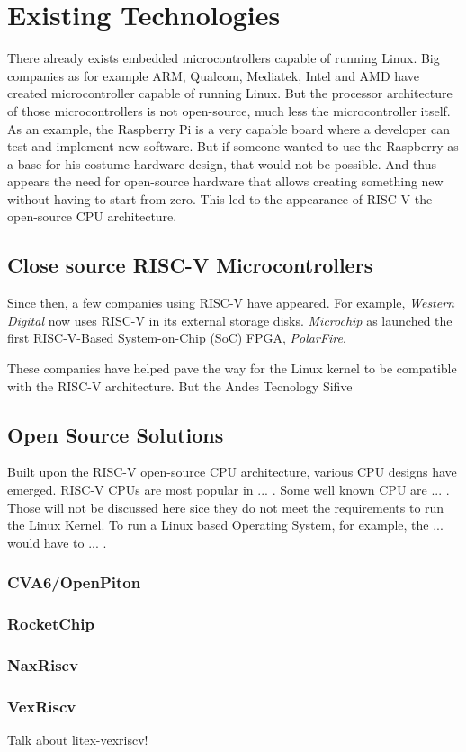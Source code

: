 \chapter{Existing Technologies}
There already exists embedded microcontrollers capable of running Linux. Big companies as for example ARM, Qualcom, Mediatek, Intel and AMD have created microcontroller capable of running Linux. But the processor architecture of those microcontrollers is not open-source, much less the microcontroller itself. As an example, the Raspberry Pi is a very capable board where a developer can test and implement new software. But if someone wanted to use the Raspberry as a base for his costume hardware design, that would not be possible. And thus appears the need for open-source hardware that allows creating something new without having to start from zero. This led to the appearance of RISC-V the open-source CPU architecture.

\section{Close source RISC-V Microcontrollers}
Since then, a few companies using RISC-V have appeared. For example, \textit{Western Digital} now uses RISC-V in its external storage disks. \textit{Microchip} as launched the first RISC-V-Based System-on-Chip (SoC) FPGA, \textit{PolarFire}. 

These companies have helped pave the way for the Linux kernel to be compatible with the RISC-V architecture. But the 
Andes Tecnology
Sifive

\section{Open Source Solutions}
Built upon the RISC-V open-source CPU architecture, various CPU designs have emerged. RISC-V CPUs are most popular in ... . Some well known CPU are ... . Those will not be discussed here sice they do not meet the requirements to run the Linux Kernel. To run a Linux based Operating System, for example, the ... would have to ... .

\subsection{CVA6/OpenPiton}
\subsection{RocketChip}
\subsection{NaxRiscv}
\subsection{VexRiscv}

Talk about litex-vexriscv!